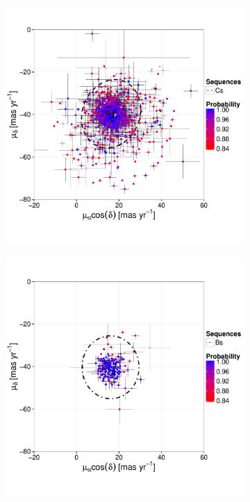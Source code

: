 \begin{figure}[ht!]
\begin{subfigure}[t]{0.45\textwidth}
    \end{subfigure}
    \begin{subfigure}[t]{0.45\textwidth}
       \includegraphics[page=7,width=\textwidth]{background/Figures/BHM/Cs_members.pdf}
    \end{subfigure}
    \begin{subfigure}[t]{0.45\textwidth}
     \includegraphics[page=7,width=\textwidth]{background/Figures/BHM/Bs_members.pdf}

\end{subfigure}
\end{figure}
